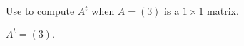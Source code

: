 \documentclass{ximera}
\begin{document}
\begin{computerExercise} \label{c1.3.5b}
Use \Matlab to compute $A^t$ when $A=(3)$ is a $1\times 1$ matrix.

\begin{solution}
\ans $A^t = (3).$




\end{solution}
\end{computerExercise}
\end{document}
